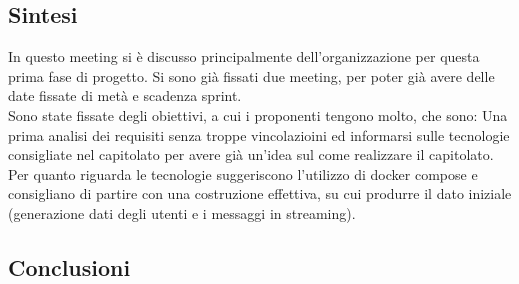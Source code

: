 \documentclass[12pt]{article}
\begin{document}
\subsection{Sintesi}
In questo meeting si è discusso principalmente dell'organizzazione per questa prima fase di progetto. Si sono già fissati due meeting, per poter già avere delle date fissate di metà e scadenza sprint. \\
Sono state fissate degli obiettivi, a cui i proponenti tengono molto, che sono: Una prima analisi dei requisiti senza troppe vincolazioini ed informarsi sulle tecnologie consigliate nel capitolato per avere già un'idea sul come realizzare il capitolato.\\
Per quanto riguarda le tecnologie suggeriscono l'utilizzo di docker compose e consigliano di partire con una costruzione effettiva, su cui produrre il dato iniziale (generazione dati degli utenti e i messaggi in streaming).\\
\subsection{Conclusioni}
\end{document}
